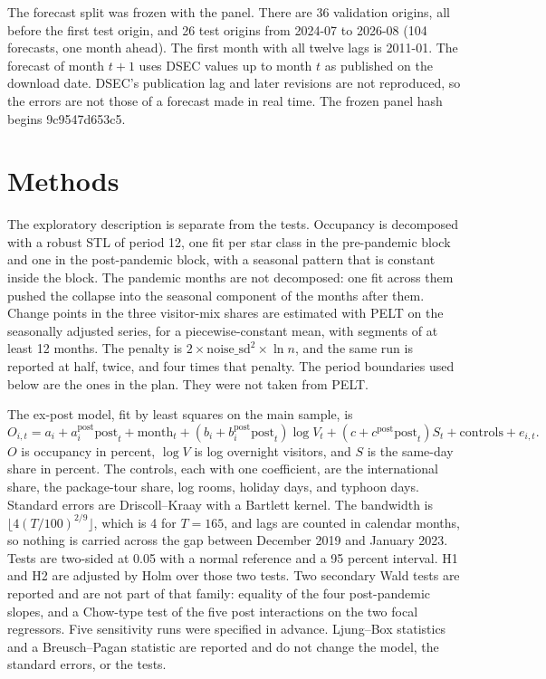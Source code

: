 \documentclass[11pt,a4paper]{article}
\begin{document}
The forecast split was frozen with the panel. There are 36 validation origins, all before the first test origin, and 26 test origins from 2024-07 to 2026-08 (104 forecasts, one month ahead). The first month with all twelve lags is 2011-01. The forecast of month \(t+1\) uses DSEC values up to month \(t\) as published on the download date. DSEC's publication lag and later revisions are not reproduced, so the errors are not those of a forecast made in real time. The frozen panel hash begins 9c9547d653c5.

\section{Methods}
The exploratory description is separate from the tests. Occupancy is decomposed with a robust STL \cite{cleveland1990} of period 12, one fit per star class in the pre-pandemic block and one in the post-pandemic block, with a seasonal pattern that is constant inside the block. The pandemic months are not decomposed: one fit across them pushed the collapse into the seasonal component of the months after them. Change points in the three visitor-mix shares are estimated with PELT \cite{killick2012} on the seasonally adjusted series, for a piecewise-constant mean, with segments of at least 12 months. The penalty is \(2 \times \mathrm{noise\_sd}^{2} \times \ln n\), and the same run is reported at half, twice, and four times that penalty. The period boundaries used below are the ones in the plan. They were not taken from PELT.

The ex-post model, fit by least squares on the main sample, is
\[
O_{i,t} = a_i + a^{\mathrm{post}}_i \mathrm{post}_t + \mathrm{month}_t + (b_i + b^{\mathrm{post}}_i \mathrm{post}_t)\log V_t + (c + c^{\mathrm{post}}\mathrm{post}_t) S_t + \mathrm{controls} + e_{i,t}.
\]
\(O\) is occupancy in percent, \(\log V\) is log overnight visitors, and \(S\) is the same-day share in percent. The controls, each with one coefficient, are the international share, the package-tour share, log rooms, holiday days, and typhoon days. Standard errors are Driscoll--Kraay \cite{driscoll1998} with a Bartlett kernel. The bandwidth is \(\lfloor 4(T/100)^{2/9}\rfloor\), which is 4 for \(T=165\), and lags are counted in calendar months, so nothing is carried across the gap between December 2019 and January 2023. Tests are two-sided at 0.05 with a normal reference and a 95 percent interval. H1 and H2 are adjusted by Holm \cite{holm1979} over those two tests. Two secondary Wald tests are reported and are not part of that family: equality of the four post-pandemic slopes, and a Chow-type test of the five post interactions on the two focal regressors. Five sensitivity runs were specified in advance. Ljung--Box statistics and a Breusch--Pagan statistic are reported and do not change the model, the standard errors, or the tests.
\end{document}
